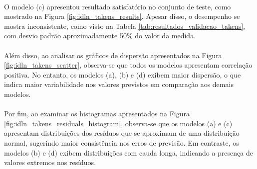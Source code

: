 \paragraph{} O modelo (c) apresentou resultado satisfatório no conjunto de teste, como mostrado na Figura \ref{fig:idln_takens_results}. Apesar disso, o desempenho se mostra inconsistente, como visto na Tabela \ref{tab:resultados_validacao_takens}, com desvio padrão aproximadamente 50\% do valor da medida.
\paragraph{} Além disso, ao analisar os gráficos de dispersão apresentados na Figura \ref{fig:idln_takens_scatter}, observa-se que todos os modelos apresentam correlação positiva. No entanto, os modelos (a), (b) e (d) exibem maior dispersão, o que indica maior variabilidade nos valores previstos em comparação aos demais modelos.
\paragraph{} Por fim, ao examinar os histogramas apresentados na Figura \ref{fig:idln_takens_residuals_histogram}, observa-se que os modelos (a) e (c) apresentam distribuições dos resíduos que se aproximam de uma distribuição normal, sugerindo maior consistência nos erros de previsão. Em contraste, os modelos (b) e (d) exibem distribuições com cauda longa, indicando a presença de valores extremos nos resíduos.

